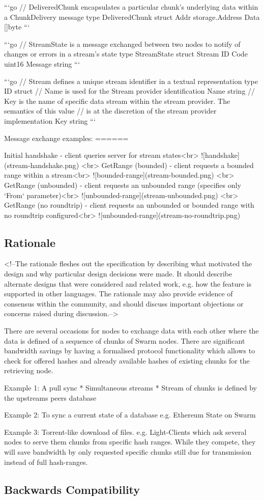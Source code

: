 ```go
// DeliveredChunk encapsulates a particular chunk's underlying data within a ChunkDelivery message
type DeliveredChunk struct {
	Addr storage.Address
	Data []byte
}
```

```go
// StreamState is a message exchanged between two nodes to notify of changes or errors in a stream's state
type StreamState struct {
	Stream  ID
	Code    uint16
	Message string
}
```

```go
// Stream defines a unique stream identifier in a textual representation
type ID struct {
	// Name is used for the Stream provider identification
	Name string
	// Key is the name of specific data stream within the stream provider. The semantics of this value
	// is at the discretion of the stream provider implementation
	Key string
}
```

Message exchange examples:
======

Initial handshake - client queries server for stream states<br>
![handshake](stream-handshake.png)
<br>
GetRange (bounded) - client requests a bounded range within a stream<br>
![bounded-range](stream-bounded.png)
<br>
GetRange (unbounded) - client requests an unbounded range (specifies only `From` parameter)<br>
![unbounded-range](stream-unbounded.png)
<br>
GetRange (no roundtrip) - client requests an unbounded or bounded range with no roundtrip configured<br>
![unbounded-range](stream-no-roundtrip.png)

\subsection{Rationale}
<!--The rationale fleshes out the specification by describing what motivated the design and why particular design decisions were made. It should describe alternate designs that were considered and related work, e.g. how the feature is supported in other languages. The rationale may also provide evidence of consensus within the community, and should discuss important objections or concerns raised during discussion.-->

There are several occasions for nodes to exchange data with each other where the data is defined of a sequence of chunks of Swarm nodes. There are significant bandwidth savings by having a formalised protocol functionality which allows to check for offered hashes and already available hashes of existing chunks for the retrieving node.

Example 1: 
A pull sync
 * Simultaneous streams
 * Stream of chunks is defined by the upstreams peers database

Example 2:
To sync a current state of a database e.g. Ethereum State on Swarm

Example 3:
Torrent-like download of files. e.g. Light-Clients which ask several nodes to serve them chunks from specific hash ranges.
While they compete, they will save bandwidth by only requested specific chunks still due for transmission instead of full hash-ranges.

\subsection{Backwards Compatibility}